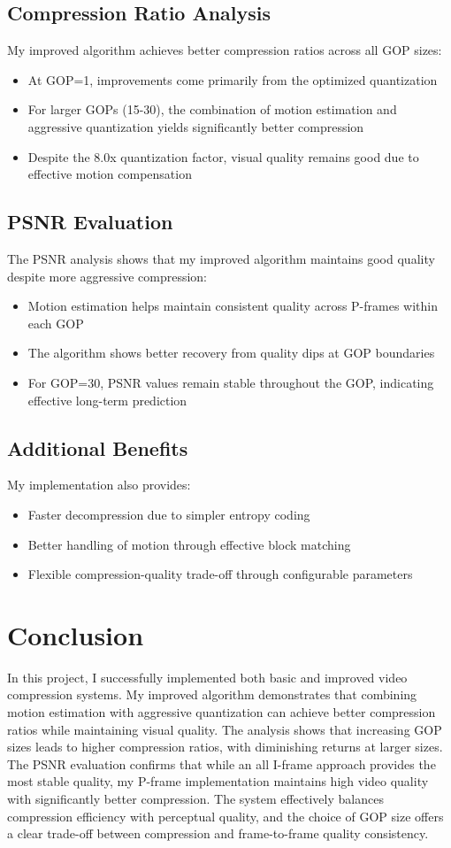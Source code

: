 \documentclass{article}
\begin{document}
\subsection{Compression Ratio Analysis}
My improved algorithm achieves better compression ratios across all GOP sizes:
\begin{itemize}
    \item At GOP=1, improvements come primarily from the optimized quantization
    \item For larger GOPs (15-30), the combination of motion estimation and aggressive quantization yields significantly better compression
    \item Despite the 8.0x quantization factor, visual quality remains good due to effective motion compensation
\end{itemize}

\subsection{PSNR Evaluation}
The PSNR analysis shows that my improved algorithm maintains good quality despite more aggressive compression:
\begin{itemize}
    \item Motion estimation helps maintain consistent quality across P-frames within each GOP
    \item The algorithm shows better recovery from quality dips at GOP boundaries
    \item For GOP=30, PSNR values remain stable throughout the GOP, indicating effective long-term prediction
\end{itemize}

\subsection{Additional Benefits}
My implementation also provides:
\begin{itemize}
    \item Faster decompression due to simpler entropy coding
    \item Better handling of motion through effective block matching
    \item Flexible compression-quality trade-off through configurable parameters
\end{itemize}

\section{Conclusion}
In this project, I successfully implemented both basic and improved video compression systems. My improved algorithm demonstrates that combining motion estimation with aggressive quantization can achieve better compression ratios while maintaining visual quality. The analysis shows that increasing GOP sizes leads to higher compression ratios, with diminishing returns at larger sizes. The PSNR evaluation confirms that while an all I-frame approach provides the most stable quality, my P-frame implementation maintains high video quality with significantly better compression. The system effectively balances compression efficiency with perceptual quality, and the choice of GOP size offers a clear trade-off between compression and frame-to-frame quality consistency.
\end{document}
